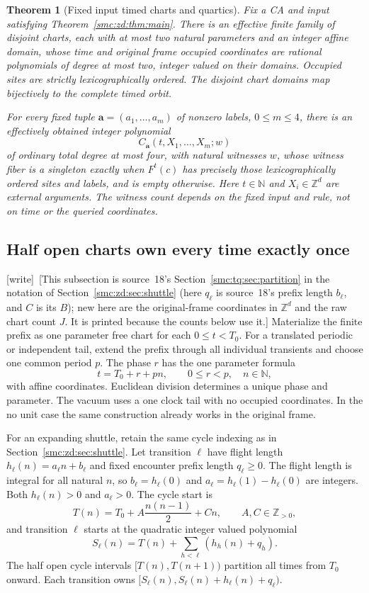 \documentclass[11pt,letterpaper]{article}
\numberwithin{equation}{section}
\newtheorem{theorem}{Theorem}[section]
\theoremstyle{definition}
\theoremstyle{remark}
\newcommand{\Z}{\mathbb Z}
\newcommand{\NN}{\mathbb N}
\newcommand{\wtag}{\textup{[write]}}
\begin{document}
\begin{theorem}[Fixed input timed charts and quartics]\label{smc:zd:thm:quartic}
Fix a CA and input satisfying Theorem~\ref{smc:zd:thm:main}. There is an effective finite family of disjoint charts, each with at most two natural parameters and an integer affine domain, whose time and original frame occupied coordinates are rational polynomials of degree at most two, integer valued on their domains. Occupied sites are strictly lexicographically ordered. The disjoint chart domains map bijectively to the complete timed orbit.

For every fixed tuple $\mathbf a=(a_1,\ldots,a_m)$ of nonzero labels, $0\le m\le4$, there is an effectively obtained integer polynomial
\[
 C_{\mathbf a}(t,X_1,\ldots,X_m;w)
\]
of ordinary total degree at most four, with natural witnesses $w$, whose witness fiber is a singleton exactly when $F^t(c)$ has precisely those lexicographically ordered sites and labels, and is empty otherwise. Here $t\in\NN$ and $X_i\in\Z^d$ are external arguments. The witness count depends on the fixed input and rule, not on time or the queried coordinates.
\end{theorem}

\subsection{Half open charts own every time exactly once}
\wtag\ [This subsection is source~18's Section~\ref{smc:tq:sec:partition} in the notation of Section~\ref{smc:zd:sec:shuttle} (here $q_\ell$ is source~18's prefix length $b_\ell$, and $C$ is its $B$); new here are the original-frame coordinates in $\Z^d$ and the raw chart count $J$. It is printed because the counts below use it.]
Materialize the finite prefix as one parameter free chart for each $0\le t<T_0$. For a translated periodic or independent tail, extend the prefix through all individual transients and choose one common period $p$. The phase $r$ has the one parameter formula
\[
 t=T_0+r+pn,\qquad 0\le r<p,\quad n\in\NN,
\]
with affine coordinates. Euclidean division determines a unique phase and parameter. The vacuum uses a one clock tail with no occupied coordinates. In the no unit case the same construction already works in the original frame.

For an expanding shuttle, retain the same cycle indexing as in Section~\ref{smc:zd:sec:shuttle}. Let transition $\ell$ have flight length $h_\ell(n)=a_\ell n+b_\ell$ and fixed encounter prefix length $q_\ell\ge0$. The flight length is integral for all natural $n$, so $b_\ell=h_\ell(0)$ and $a_\ell=h_\ell(1)-h_\ell(0)$ are integers. Both $h_\ell(n)>0$ and $a_\ell>0$. The cycle start is
\[
 T(n)=T_0+A\frac{n(n-1)}2+Cn,\qquad A,C\in\Z_{>0},
\]
and transition $\ell$ starts at the quadratic integer valued polynomial
\[
 S_\ell(n)=T(n)+\sum_{h<\ell}(h_h(n)+q_h).
\]
The half open cycle intervals $[T(n),T(n+1))$ partition all times from $T_0$ onward. Each transition owns $[S_\ell(n),S_\ell(n)+h_\ell(n)+q_\ell)$.
\end{document}
